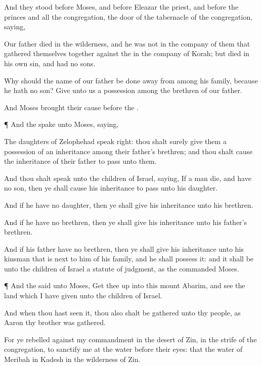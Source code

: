 {And they
stood
before
Moses, and
before
Eleazar the
priest, and
before the
princes and all the
congregation,
{} the
door of the
tabernacle of the
congregation,
saying,

Our
father
died in the
wilderness, and he was not
in the
company of them that gathered themselves
together against the
{} in the
company of
Korah; but
died in his own
sin, and had no
sons.

Why should the
name of our
father be done
away from
among his
family, because he hath no
son?
Give unto us
{} a
possession
among the
brethren of our
father.

And
Moses
brought their
cause
before the
{}.


\par }{\PP {}¶ And the
{}
spake unto
Moses,
saying,

The
daughters of
Zelophehad
speak
right: thou shalt
surely
give them a
possession of an
inheritance
among their
father’s
brethren; and thou shalt cause the
inheritance of their
father to
pass unto them.

And thou shalt
speak unto the
children of
Israel,
saying, If a
man
die, and have no
son, then ye shall cause his
inheritance to
pass unto his
daughter.

And if he have no
daughter, then ye shall
give his
inheritance unto his
brethren.

And if he have no
brethren, then ye shall
give his
inheritance unto his
father’s
brethren.

And if his
father have no
brethren, then ye shall
give his
inheritance unto his
kinsman that is
next to him of his
family, and he shall
possess it: and it shall be unto the
children of
Israel a
statute of
judgment, as the
{}
commanded
Moses.


\par }{\PP {}¶ And the
{}
said unto
Moses, Get thee
up into this
mount
Abarim, and
see the
land which I have
given unto the
children of
Israel.

And when thou hast
seen it, thou also shalt be
gathered unto thy
people, as
Aaron thy
brother was
gathered.

For ye
rebelled against my
commandment in the
desert of
Zin, in the
strife of the
congregation, to
sanctify me at the
water before their
eyes: that
{} the
water of
Meribah in
Kadesh in the
wilderness of
Zin.


}
